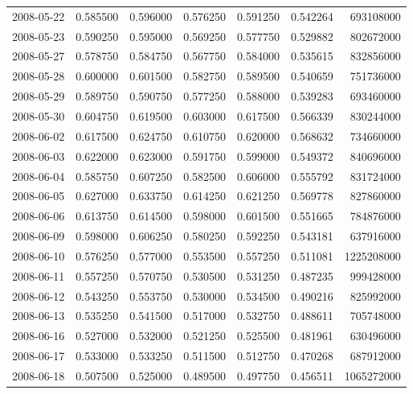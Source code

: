 \begin{tabular}{lrrrrrr}
2008-05-22 &    0.585500 &    0.596000 &    0.576250 &    0.591250 &    0.542264 &   693108000 \\
2008-05-23 &    0.590250 &    0.595000 &    0.569250 &    0.577750 &    0.529882 &   802672000 \\
2008-05-27 &    0.578750 &    0.584750 &    0.567750 &    0.584000 &    0.535615 &   832856000 \\
2008-05-28 &    0.600000 &    0.601500 &    0.582750 &    0.589500 &    0.540659 &   751736000 \\
2008-05-29 &    0.589750 &    0.590750 &    0.577250 &    0.588000 &    0.539283 &   693460000 \\
2008-05-30 &    0.604750 &    0.619500 &    0.603000 &    0.617500 &    0.566339 &   830244000 \\
2008-06-02 &    0.617500 &    0.624750 &    0.610750 &    0.620000 &    0.568632 &   734660000 \\
2008-06-03 &    0.622000 &    0.623000 &    0.591750 &    0.599000 &    0.549372 &   840696000 \\
2008-06-04 &    0.585750 &    0.607250 &    0.582500 &    0.606000 &    0.555792 &   831724000 \\
2008-06-05 &    0.627000 &    0.633750 &    0.614250 &    0.621250 &    0.569778 &   827860000 \\
2008-06-06 &    0.613750 &    0.614500 &    0.598000 &    0.601500 &    0.551665 &   784876000 \\
2008-06-09 &    0.598000 &    0.606250 &    0.580250 &    0.592250 &    0.543181 &   637916000 \\
2008-06-10 &    0.576250 &    0.577000 &    0.553500 &    0.557250 &    0.511081 &  1225208000 \\
2008-06-11 &    0.557250 &    0.570750 &    0.530500 &    0.531250 &    0.487235 &   999428000 \\
2008-06-12 &    0.543250 &    0.553750 &    0.530000 &    0.534500 &    0.490216 &   825992000 \\
2008-06-13 &    0.535250 &    0.541500 &    0.517000 &    0.532750 &    0.488611 &   705748000 \\
2008-06-16 &    0.527000 &    0.532000 &    0.521250 &    0.525500 &    0.481961 &   630496000 \\
2008-06-17 &    0.533000 &    0.533250 &    0.511500 &    0.512750 &    0.470268 &   687912000 \\
2008-06-18 &    0.507500 &    0.525000 &    0.489500 &    0.497750 &    0.456511 &  1065272000 \\

\end{tabular}
